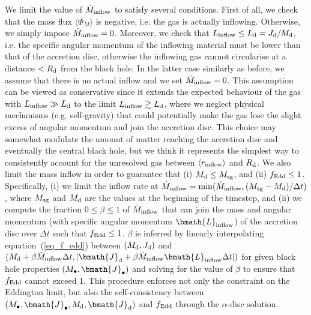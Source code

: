 \documentclass[a4paper,fleqn,usenatbib]{mnras}
\begin{document}
We limit the value of $\dot{M}_{\rm inflow}$ to satisfy several conditions.
First of all, we check that the mass flux $\langle \Phi_{M} \rangle$ is negative, i.e. the gas is actually inflowing.
Otherwise, we simply impose $\dot{M}_{\rm inflow} = 0$.
Moreover, we check that $L_{\rm inflow} \leq L_{\rm d} = J_{\rm d} / M_{\rm d}$, i.e. the specific angular momentum of the inflowing material must be lower than that of the accretion disc, otherwise the inflowing gas cannot circularise at a distance $< R_{\rm d}$ from the black hole.
In the latter case similarly as before, we assume that there is no actual inflow and we set $\dot{M}_{\rm inflow} = 0$.
This assumption can be viewed as conservative since it extends the expected behaviour of the gas with $L_{\rm inflow} \gg L_{\rm d}$ to the limit $L_{\rm inflow} \gtrsim L_{\rm d}$, where we neglect physical mechanisms (e.g. self-gravity) that could potentially make the gas lose the slight excess of angular momentum and join the accretion disc.
This choice may somewhat modulate the amount of matter reaching the accretion disc and eventually the central black hole, but we think it represents the simplest way to consistently account for the unresolved gas between $\langle r_{\rm inflow} \rangle$ and $R_{\rm d}$.
We also limit the mass inflow in order to guarantee that (i) $M_{\rm d} \leq M_{\rm sg}$, and (ii) $f_{\rm Edd} \leq 1$.
Specifically, (i) we limit the inflow rate at $\dot{M}_{\rm inflow} = \min(\dot{M}_{\rm inflow}, (M_{\rm sg} - M_{\rm d}) / \Delta t)$, where $M_{\rm sg}$ and $M_{\rm d}$ are the values at the beginning of the timestep, and (ii) we compute the fraction $0 \leq \beta \leq 1$ of $\dot{M}_{\rm inflow}$ that can join the mass and angular momentum (with specific angular momentum $\bmath{L}_{\rm inflow}$) of the accretion disc over $\Delta t$ such that $f_{\rm Edd} \leq 1$.
$\beta$ is inferred by linearly interpolating equation~(\ref{eq_f_edd}) between $(M_{\rm d}, J_{\rm d})$ and  $(M_{\rm d} + \beta \dot{M}_{\rm inflow} \Delta t, |\bmath{J}_{\rm d} + \beta \dot{M}_{\rm inflow} \bmath{L}_{\rm inflow} \Delta t |)$ for given black hole properties $(M_{\bullet}, \bmath{J}_{\bullet})$ and solving for the value of $\beta$ to ensure that $f_{\rm Edd}$ cannot exceed 1.
This procedure enforces not only the constraint on the Eddington limit, but also the self-consistency between $(M_{\bullet}, \bmath{J}_{\bullet}, M_{\rm d}, \bmath{J}_{\rm d})$ and $f_{\rm Edd}$ through the $\alpha$-disc solution.
\end{document}
